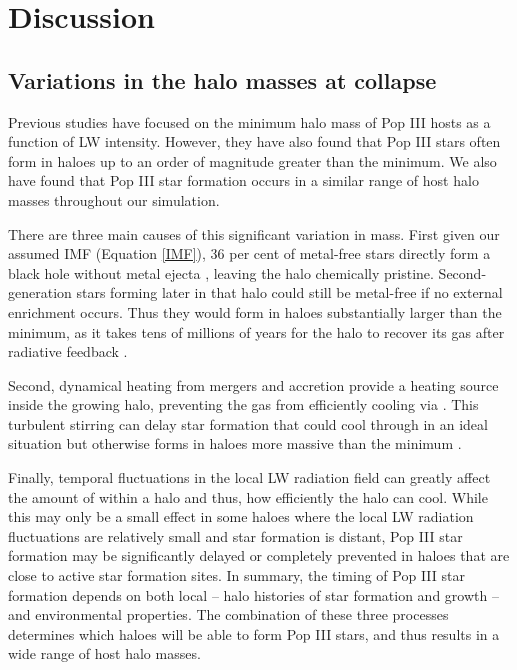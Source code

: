 \documentclass[fleqn,usenatbib]{mnras}
\begin{document}
\section{Discussion}

\subsection{Variations in the halo masses at collapse}
\label{sec:variations}
Previous studies have focused on the minimum halo mass of Pop III hosts as a function of LW intensity. However, they have also found that Pop III stars often form in haloes up to an order of magnitude greater than the minimum. We also have found that Pop III star formation occurs in a similar range of host halo masses throughout our simulation.

There are three main causes of this significant variation in mass. First given our assumed IMF (Equation \ref{IMF}), 36 per cent of metal-free stars directly form a black hole without metal ejecta \citep{Heger03}, leaving the halo chemically pristine.  Second-generation stars forming later in that halo could still be metal-free if no external enrichment occurs. Thus they would form in haloes substantially larger than the minimum, as it takes tens of millions of years for the halo to recover its gas after radiative feedback \citep{Muratov13, Jeon14_Recovery}.

Second, dynamical heating from mergers and accretion provide a heating source inside the growing halo, preventing the gas from efficiently cooling via \hh{}. This turbulent stirring can delay star formation that could cool through \hh{} in an ideal situation but otherwise forms in haloes more massive than the minimum \citep{Yoshida03, Wise19}.

Finally, temporal fluctuations in the local LW radiation field can greatly affect the amount of \hh{} within a halo and thus, how efficiently the halo can cool. While this may only be a small effect in some haloes where the local LW radiation fluctuations are relatively small and star formation is distant, Pop III star formation may be significantly delayed or completely prevented in haloes that are close to active star formation sites.  In summary, the timing of Pop III star formation depends on both local -- halo histories of star formation and growth -- and environmental properties.  The combination of these three processes determines which haloes will be able to form Pop III stars, and thus results in a wide range of host halo masses. 
\end{document}
